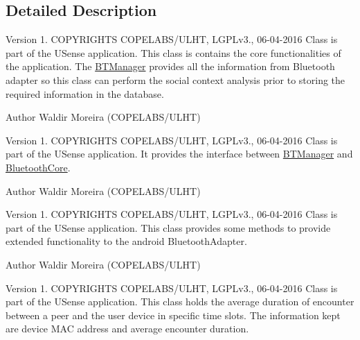 \subsection{Detailed Description}
\begin{DoxyVersion}{Version}
1. C\+O\+P\+Y\+R\+I\+G\+H\+T\+S C\+O\+P\+E\+L\+A\+B\+S/\+U\+L\+H\+T, L\+G\+P\+Lv3., 06-\/04-\/2016 Class is part of the U\+Sense application. This class is contains the core functionalities of the application. The \hyperlink{classcs_1_1usense_1_1bluetooth_1_1_b_t_manager}{B\+T\+Manager} provides all the information from Bluetooth adapter so this class can perform the social context analysis prior to storing the required information in the database. 
\end{DoxyVersion}
\begin{DoxyAuthor}{Author}
Waldir Moreira (C\+O\+P\+E\+L\+A\+B\+S/\+U\+L\+H\+T)
\end{DoxyAuthor}
\begin{DoxyVersion}{Version}
1. C\+O\+P\+Y\+R\+I\+G\+H\+T\+S C\+O\+P\+E\+L\+A\+B\+S/\+U\+L\+H\+T, L\+G\+P\+Lv3., 06-\/04-\/2016 Class is part of the U\+Sense application. It provides the interface between \hyperlink{classcs_1_1usense_1_1bluetooth_1_1_b_t_manager}{B\+T\+Manager} and \hyperlink{classcs_1_1usense_1_1bluetooth_1_1_bluetooth_core}{Bluetooth\+Core}. 
\end{DoxyVersion}
\begin{DoxyAuthor}{Author}
Waldir Moreira (C\+O\+P\+E\+L\+A\+B\+S/\+U\+L\+H\+T)
\end{DoxyAuthor}
\begin{DoxyVersion}{Version}
1. C\+O\+P\+Y\+R\+I\+G\+H\+T\+S C\+O\+P\+E\+L\+A\+B\+S/\+U\+L\+H\+T, L\+G\+P\+Lv3., 06-\/04-\/2016 Class is part of the U\+Sense application. This class provides some methods to provide extended functionality to the android Bluetooth\+Adapter. 
\end{DoxyVersion}
\begin{DoxyAuthor}{Author}
Waldir Moreira (C\+O\+P\+E\+L\+A\+B\+S/\+U\+L\+H\+T)
\end{DoxyAuthor}
\begin{DoxyVersion}{Version}
1. C\+O\+P\+Y\+R\+I\+G\+H\+T\+S C\+O\+P\+E\+L\+A\+B\+S/\+U\+L\+H\+T, L\+G\+P\+Lv3., 06-\/04-\/2016 Class is part of the U\+Sense application. This class holds the average duration of encounter between a peer and the user device in specific time slots. The information kept are device M\+A\+C address and average encounter duration. 
\end{DoxyVersion}
